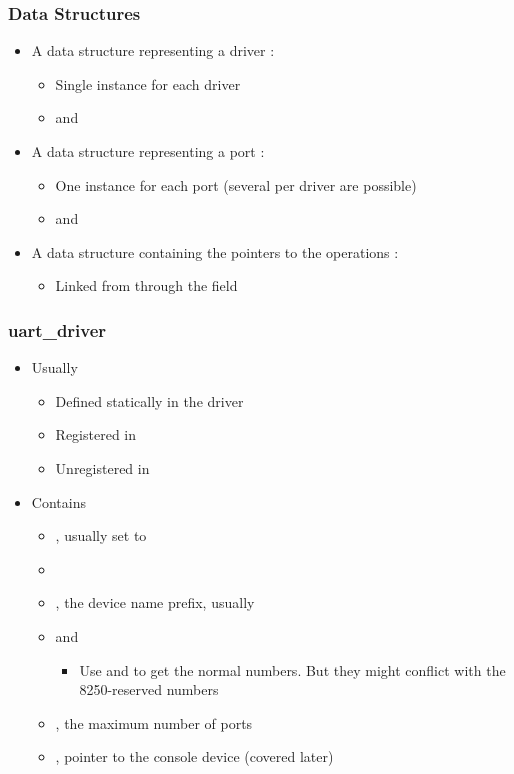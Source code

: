 \begin{frame}
  \frametitle{Data Structures}
  \begin{itemize}
  \item A data structure representing a driver : 
    \begin{itemize}
    \item Single instance for each driver
    \item {} and
    \end{itemize}
  \item A data structure representing a port : 
    \begin{itemize}
    \item One instance for each port (several per driver are possible)
    \item {} and 
    \end{itemize}
  \item A data structure containing the pointers to the operations :
    \begin{itemize}
    \item Linked from  through the  field
    \end{itemize}
  \end{itemize}
\end{frame}

\begin{frame}
  \frametitle{uart\_driver}
  \begin{itemize}
  \item Usually
    \begin{itemize}
    \item Defined statically in the driver
    \item Registered in 
    \item Unregistered in 
    \end{itemize}
  \item Contains
    \begin{itemize}
    \item {}, usually set to 
    \item {}
    \item {}, the device name prefix, usually 
    \item {} and 
      \begin{itemize}
      \item Use  and  to get the normal
        numbers. But they might conflict with the 8250-reserved
        numbers
      \end{itemize}
    \item {}, the maximum number of ports
    \item {}, pointer to the console device (covered later)
    \end{itemize}
  \end{itemize}
\end{frame}

